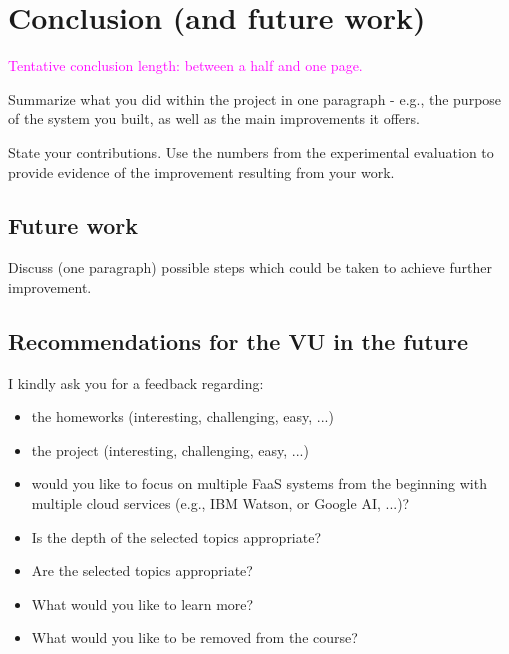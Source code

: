 \chapter{\label{chap:conclusion}Conclusion (and future work)}

\textcolor{magenta}{Tentative conclusion length: between a half and one page.}


Summarize what you did within the project in one paragraph - e.g., the purpose of the system you built, as well as the main improvements it offers.

\vspace{20 pt}
State your contributions. Use the numbers from the experimental evaluation to provide evidence of the improvement resulting from your work.



%
%
%
\section{Future work} 

Discuss (one paragraph) possible steps which could be taken to achieve further improvement.



%
%
%
\section{Recommendations for the VU in the future}

I kindly ask you for a feedback regarding:
\begin{itemize}
    \item the homeworks (interesting, challenging, easy, ...)
    
    \item the project (interesting, challenging, easy, ...)
    
    \item would you like to focus on multiple FaaS systems from the beginning with multiple cloud services (e.g., IBM Watson, or Google AI, ...)?
    
    \item Is the depth of the selected topics appropriate?

    \item Are the selected topics appropriate?
        
    \item What would you like to learn more?
    
    \item What would you like to be removed from the course?
\end{itemize}